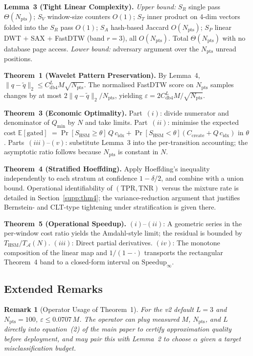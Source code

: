 \documentclass[10pt,twocolumn,a4paper]{article}
\newtheorem{remark}{Remark}
\newcommand{\SHSM}{S_{\mathrm{HSM}}}
\newcommand{\SR}{S_{R}}
\newcommand{\SV}{S_{V}}
\newcommand{\ST}{S_{T}}
\newcommand{\SA}{S_{A}}
\newcommand{\SPER}{S_{P}}
\newcommand{\Npts}{N_{\mathrm{pts}}}
\newcommand{\Cdb}{C_{\mathrm{db4}}}
\newcommand{\TPR}{\mathrm{TPR}}
\newcommand{\TNR}{\mathrm{TNR}}
\begin{document}
\textbf{Lemma~3 (Tight Linear Complexity).}
\emph{Upper bound:} $\SR$ single pass $\Theta(\Npts)$; $\SV$
window-size counters $O(1)$; $\ST$ inner product on 4-dim vectors
folded into the $\SR$ pass $O(1)$; $\SA$ hash-based Jaccard
$O(\Npts)$; $\SPER$ linear DWT $+$ SAX $+$ FastDTW (band $r{=}3$),
all $O(\Npts)$. Total $\Theta(\Npts)$ with no database page access.
\emph{Lower bound:} adversary argument over the $\Npts$ unread
positions.

\textbf{Theorem~1 (Wavelet Pattern Preservation).}
By Lemma~4, $\|q-\tilde{q}\|_{2}\leq \Cdb^{L}M\sqrt{\Npts}$.
The normalised FastDTW score on $\Npts$ samples changes by at most
$2\|q-\tilde{q}\|_{2}/\Npts$, yielding $\varepsilon\!=\!2\Cdb^{L}M/\sqrt{\Npts}$.

\textbf{Theorem~3 (Economic Optimality).}
Part~$(i)$: divide numerator and denominator of $Q_{\min}$ by $N$ and
take limits. Part~$(ii)$: minimise the expected cost
$\mathbb{E}[\text{gated}]$
$=\Pr[\SHSM\!\geq\!\theta]\,Q\,c_{\mathrm{idx}}+\Pr[\SHSM\!<\!\theta](C_{\mathrm{create}}+Q\,c_{\mathrm{idx}})$
in $\theta$. Parts~$(iii)$--$(v)$: substitute Lemma~3
into the per-transition accounting; the asymptotic ratio follows
because $\Npts$ is constant in $N$.

\textbf{Theorem~4 (Stratified Hoeffding).}
Apply Hoeffding's inequality independently to each
stratum at confidence $1\!-\!\delta/2$, and combine with a union bound.
Operational identifiability of $(\TPR,\TNR)$ versus the mixture rate
is detailed in Section~\ref{supp:thm4}; the variance-reduction argument
that justifies Bernstein- and CLT-type tightening under stratification
is given there.

\textbf{Theorem~5 (Operational Speedup).}
$(i)$--$(ii)$: A geometric series in the per-window cost ratio yields
the Amdahl-style limit; the residual is bounded by
$T_{\mathrm{HSM}}/T_{\mathcal{A}}(N)$. $(iii)$: Direct partial
derivatives. $(iv)$: The monotone composition of the linear map and
$1/(1-\cdot)$ transports the rectangular Theorem~4 band to
a closed-form interval on $\mathrm{Speedup}_\infty$.

\subsection{Extended Remarks}

\begin{remark}[Operator Usage of Theorem~1]
For the v2 default $L\!=\!3$ and $\Npts\!=\!100$,
$\varepsilon\!\leq\!0.0707\,M$. The operator can plug measured $M$,
$\Npts$, and $L$ directly into equation~(2) of the main paper to certify
approximation quality before deployment, and may pair this with
Lemma~2 to choose $\alpha$ given a target misclassification
budget.
\end{remark}
\end{document}

